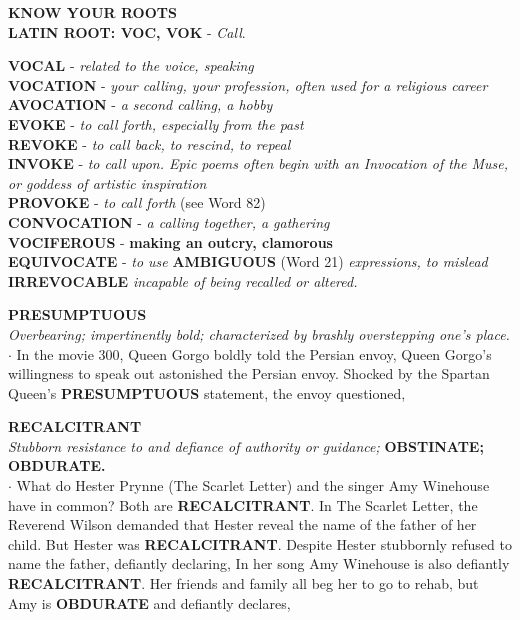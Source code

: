 \documentclass{exam}
\begin{document}
\begin{questions}
\begin{tcolorbox}
\begin{center}
\textbf{ KNOW YOUR ROOTS}\\
\textbf{LATIN ROOT: VOC, VOK} - \textit{Call}.\\  
\end{center}  
\textbf{VOCAL} - \textit{related to the voice, speaking}\\
\textbf{VOCATION} - \textit{your calling, your profession, often used for a religious career}\\
\textbf{AVOCATION} -  \textit{a second calling, a hobby}\\ 
\textbf{EVOKE} -  \textit{to call forth, especially from the past}\\
\textbf{REVOKE} -  \textit{to call back, to rescind, to repeal}\\ 
\textbf{INVOKE} - \textit{to call upon. Epic poems often begin with an Invocation of the Muse, or goddess of artistic inspiration}\\
\textbf{PROVOKE} -  \textit{to call forth} (see Word 82)\\ 
\textbf{CONVOCATION} - \textit{a calling together, a gathering}\\
\textbf{VOCIFEROUS} - \textbf{making an outcry, clamorous}\\
\textbf{EQUIVOCATE} -  \textit{to use} \textbf{AMBIGUOUS} (Word 21) \textit{expressions, to mislead} \textbf{IRREVOCABLE} \textit{incapable of being recalled or altered.}
\end{tcolorbox}

\question \textbf{PRESUMPTUOUS}\\
\textit{Overbearing; impertinently bold; characterized by brashly overstepping one's place.}\\

$ \cdot $ In the movie 300, Queen Gorgo boldly told the
Persian envoy,  Queen Gorgo's willingness to speak out astonished the Persian envoy.
Shocked by the Spartan Queen's \textbf{PRESUMPTUOUS}
statement, the envoy questioned, 

\question \textbf{RECALCITRANT}\\
\textit{Stubborn resistance to and defiance of authority or guidance;} \textbf{OBSTINATE; OBDURATE.}\\

$ \cdot $ What do Hester Prynne (The Scarlet Letter) and the
singer Amy Winehouse have in common? Both are
\textbf{RECALCITRANT}. In The Scarlet Letter, the Reverend
Wilson demanded that Hester reveal the name of the
father of her child. But Hester was \textbf{RECALCITRANT}.
Despite  Hester stubbornly refused to
name the father, defiantly declaring,  In her song  Amy Winehouse is
also defiantly \textbf{RECALCITRANT}. Her friends and
family all beg her to go to rehab, but Amy is
\textbf{OBDURATE} and defiantly declares, 


\end{questions}
\end{document}
